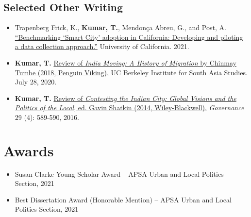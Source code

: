 \documentclass[11pt]{article}
\begin{document}
\subsection*{Selected Other Writing}	
\begin{itemize}
\item[]Trapenberg Frick, K., \textbf{Kumar, T.}, Mendon\c{c}a Abreu, G., and Post, A. \href{https://escholarship.org/uc/item/3797p0ws}{``Benchmarking `Smart City' adoption in California: Developing and piloting a data collection approach.''} University of California. 2021. 



\item[]\textbf{Kumar, T.} \href{https://southasia.berkeley.edu/sites/default/files/shared/India_Center/India_Moving.pdf}{Review of \textit{India Moving: A History of Migration} by Chinmay Tumbe (2018, Penguin Viking).}  UC Berkeley Institute for South Asia Studies. July 28, 2020.

\item[]\textbf{Kumar, T.} \href{http://onlinelibrary.wiley.com/doi/10.1111/gove.12241/abstract}{Review of \textit{Contesting the Indian City: Global Visions and the Politics of the Local}, ed. Gavin Shatkin (2014, Wiley-Blackwell).} \textit{Governance} 29 (4): 589-590, 2016. 



\end{itemize}

\vspace{2mm}
\color{MidnightBlue}

\section*{Awards}
\color{Black}
\begin{itemize}[nosep]
\item[] Susan Clarke Young Scholar Award -- APSA Urban and Local Politics Section, 2021
	\item[] Best Dissertation Award (Honorable Mention) --  APSA Urban and Local Politics Section, 2021
	
\end{itemize}



\vspace{2mm}
\color{MidnightBlue}
\end{document}
